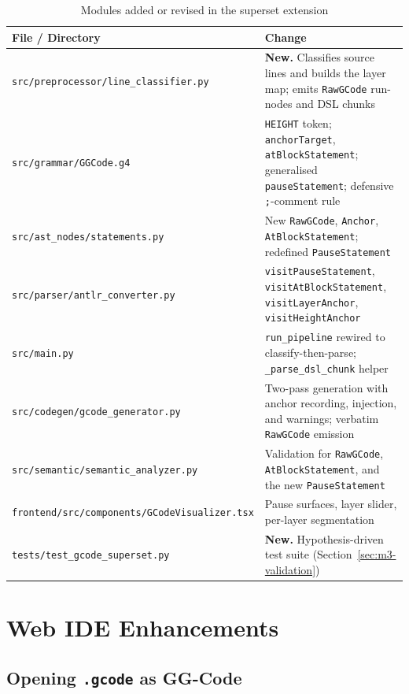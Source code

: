 \begin{table}[H]
\centering
\begin{tabular}{|l|p{8.7cm}|}
\hline
\textbf{File / Directory} & \textbf{Change} \\
\hline
\texttt{src/preprocessor/line\_classifier.py} & \textbf{New.} Classifies source lines and builds the layer map; emits \texttt{RawGCode} run-nodes and DSL chunks \\
\hline
\texttt{src/grammar/GGCode.g4} & \texttt{HEIGHT} token; \texttt{anchorTarget}, \texttt{atBlockStatement}; generalised \texttt{pauseStatement}; defensive \texttt{;}-comment rule \\
\hline
\texttt{src/ast\_nodes/statements.py} & New \texttt{RawGCode}, \texttt{Anchor}, \texttt{AtBlockStatement}; redefined \texttt{PauseStatement} \\
\hline
\texttt{src/parser/antlr\_converter.py} & \texttt{visitPauseStatement}, \texttt{visitAtBlockStatement}, \texttt{visitLayerAnchor}, \texttt{visitHeightAnchor} \\
\hline
\texttt{src/main.py} & \texttt{run\_pipeline} rewired to classify-then-parse; \texttt{\_parse\_dsl\_chunk} helper \\
\hline
\texttt{src/codegen/gcode\_generator.py} & Two-pass generation with anchor recording, injection, and warnings; verbatim \texttt{RawGCode} emission \\
\hline
\texttt{src/semantic/semantic\_analyzer.py} & Validation for \texttt{RawGCode}, \texttt{AtBlockStatement}, and the new \texttt{PauseStatement} \\
\hline
\texttt{frontend/src/components/GCodeVisualizer.tsx} & Pause surfaces, layer slider, per-layer segmentation \\
\hline
\texttt{tests/test\_gcode\_superset.py} & \textbf{New.} Hypothesis-driven test suite (Section~\ref{sec:m3-validation}) \\
\hline
\end{tabular}
\caption{Modules added or revised in the superset extension}
\label{tab:m3-files}
\end{table}

\section{Web IDE Enhancements}

\subsection*{Opening \texttt{.gcode} as GG-Code}


